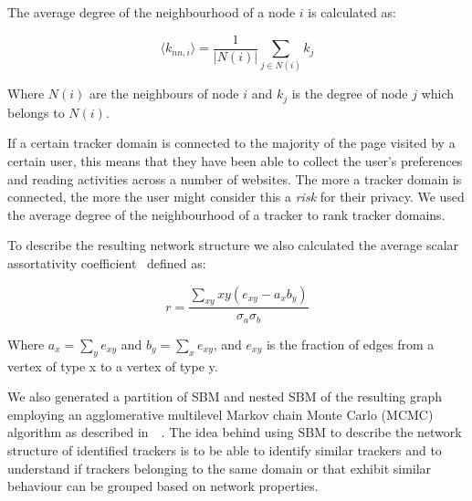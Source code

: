 The average degree of the neighbourhood of a node $i$ is calculated as:

$$ \langle k_{nn,i} \rangle= \frac{1}{| N(i) |} \sum_{j \in N(i) } {k_j} $$

Where $N(i)$ are the neighbours of node $i$ and $k_j$ is the degree of node $j$ which belongs to $N(i)$.

If a certain tracker domain is connected to the majority of the page visited by a certain user, this means that they have been able to collect the user's preferences and reading activities across a number of websites. The more a tracker domain is connected, the more the user might consider this a \emph{risk} for their privacy. We used the average degree of the neighbourhood of a tracker to rank tracker domains.

To describe the resulting network structure we also calculated the average scalar assortativity coefficient~\cite{newman2002assortative} defined as:

$$ r = \frac{\sum_{xy} xy(e_{xy} - a_x b_y)}{\sigma_a\sigma_b} $$

Where $a_x=\sum_ye_{xy}$ and $b_y=\sum_xe_{xy}$, and $e_{xy}$ is the fraction of edges from a vertex of type x to a vertex of type y.

We also generated a partition of SBM and nested SBM of the resulting graph employing an agglomerative multilevel Markov chain Monte Carlo (MCMC) algorithm as described in~\cite{peixoto2014efficient}~\cite{peixoto2013parsimonious}\cite{peixoto2012entropy}. The idea behind using SBM to describe the network structure of identified trackers is to be able to identify similar trackers and to understand if trackers belonging to the same domain or that exhibit similar behaviour can be grouped based on network properties.

